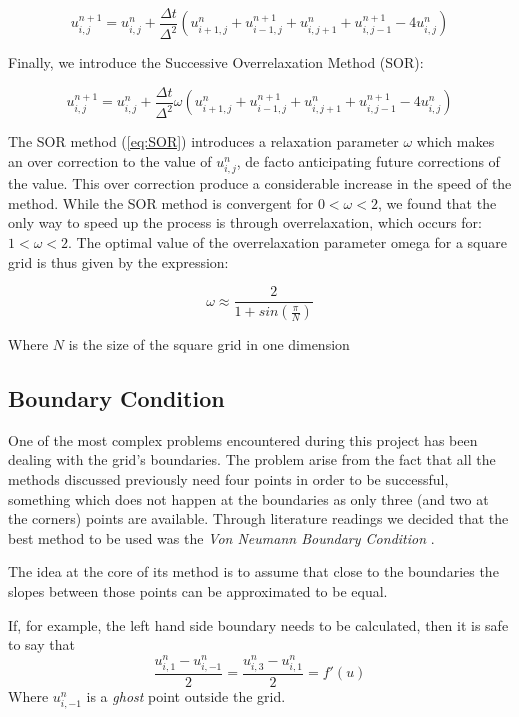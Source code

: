 \documentclass[a4paper]{article}
\begin{document}
\begin{equation}
u^{n+1}_{i,j}=u^n_{i,j}+\frac{\Delta t}{\Delta^2}(u^n_{i+1,j}+u^{n+1}_{i-1,j}+u^n_{i,j+1}+u^{n+1}_{i,j-1}-4u^n_{i,j})
\label{eq:Gauss}
\end{equation}

Finally, we introduce the Successive Overrelaxation Method (SOR): 

\begin{equation}
u^{n+1}_{i,j}=u^n_{i,j}+\frac{\Delta t}{\Delta^2} \omega (u^n_{i+1,j}+u^{n+1}_{i-1,j}+u^n_{i,j+1}+u^{n+1}_{i,j-1}-4u^n_{i,j})
\label{eq:SOR}
\end{equation}

The SOR method (\ref{eq:SOR}) introduces a relaxation parameter $\omega$ which makes an over correction to the value of $u^n_{i,j}$, de facto anticipating future corrections of the value. This over correction produce a considerable increase in the speed of the method. While the SOR method is convergent for $0<\omega<2$, we found that the only way to speed up the process is through overrelaxation, which occurs for: $1<\omega<2$. The optimal value of the overrelaxation parameter omega for a square grid is thus given by the expression:\cite{omega} \cite{matrixcomp}


\begin{equation}
\omega \approx \frac{2}{1+sin(\frac{\pi}{N})}
\label{eq:Omega}
\end{equation}

Where $N$ is the size of the square grid in one dimension

\subsection{Boundary Condition}

One of the most complex problems encountered during this project has been dealing with the grid's boundaries. The problem arise from the fact that all the methods discussed previously need four points in order to be successful, something which does not happen at the boundaries as only three (and two at the corners) points are available. Through literature readings we decided that the best method to be used was the \textit{Von Neumann Boundary Condition} \cite{vonNeuman}.
 

The idea at the core of its method is to assume that close to the boundaries the slopes between those points can be approximated to be equal.

If, for example, the left hand side boundary needs to be calculated, then it is safe to say that $$\frac{u^n_{i,1}-u^n_{i,-1}}{2}=\frac{u^n_{i,3}-u^n_{i,1}}{2}=f'(u)$$
Where $u^n_{i,-1}$ is a \textit{ghost} point outside the grid. 
\end{document}
